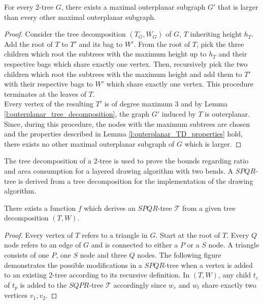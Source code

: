 \begin{lemma}
	For every 2-tree $G$, there exists a maximal outerplanar subgraph $G'$ that is larger than every other maximal outerplanar subgraph.
\end{lemma}
\begin{proof}
	Consider the tree decomposition $(T_G,W_G)$ of $G$, $T$ inheriting height $h_T$. Add the root of $T$ to $T'$ and its bag to $W'$. From the root of $T$, pick the three children which root the subtrees with the maximum height up to $h_T$ and their respective bags which share exactly one vertex. Then, recursively pick the two children which root the subtrees with the maximum height and add them to $T'$ with their respective bags to $W'$ which share exactly one vertex. This procedure terminates at the leaves of $T$.\\
	Every vertex of the resulting $T'$ is of degree maximum 3 and by Lemma \ref{l:outerplanar_tree_decomposition}, the graph $G'$ induced by $T$ is outerplanar. Since, during this procedure, the nodes with the maximum subtrees are chosen and the properties described in Lemma \ref{l:outerplanar_TD_properties} hold, there exists no other maximal outerplanar subgraph of $G$ which is larger. 
\end{proof}

The tree decomposition of a 2-tree is used to prove the bounds regarding ratio and area consumption for a layered drawing algorithm with two bends. A $SPQR$-tree is derived from a tree decomposition for the implementation of the drawing algorithm.

\begin{lemma}
	There exists a function $f$ which derives an $SPQR$-tree $\mathcal{T}$ from a given tree decomposition $(T,W)$.
\end{lemma}
\begin{proof}
	Every vertex of $T$ refers to a triangle in $G$. Start at the root of $T$. Every $Q$ node refers to an edge of $G$ and is connected to either a $P$ or a $S$ node. A triangle consists of one $P$, one $S$ node and three $Q$ nodes. The following figure demonstrates the possible modifications in a $SPQR$-tree when a vertex is added to an existing 2-tree according to its recursive definition.
	In $(T,W)$, any child $t_c$ of $t_p$ is added to the $SQPR$-tree $\mathcal{T}$ accordingly since $w_c$ and $w_t$ share exactly two vertices $v_1,v_2$.
\end{proof}



